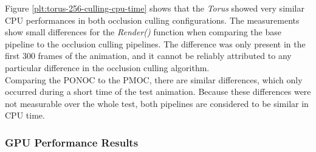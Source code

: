 \noindent
Figure \ref{plt:torus-256-culling-cpu-time} shows that the \emph{Torus} showed very similar \ac{CPU} performances 
in both occlusion culling configurations. The measurements show small differences for the \emph{Render()} function 
when comparing the base pipeline to the occlusion culling pipelines. The difference was only present in the first 300 
frames of the animation, and it cannot be reliably attributed to any particular difference in the occlusion culling 
algorithm. \\

\noindent
Comparing the \ac{PONOC} to the \ac{PMOC}, there are similar differences, which only occurred during a 
short time of the test animation. Because these differences were not measurable over the whole test, both pipelines 
are considered to be similar in \ac{CPU} time.

\subsubsection*{GPU Performance Results} \label{subsubsec-gpu-performance-results-torus}

